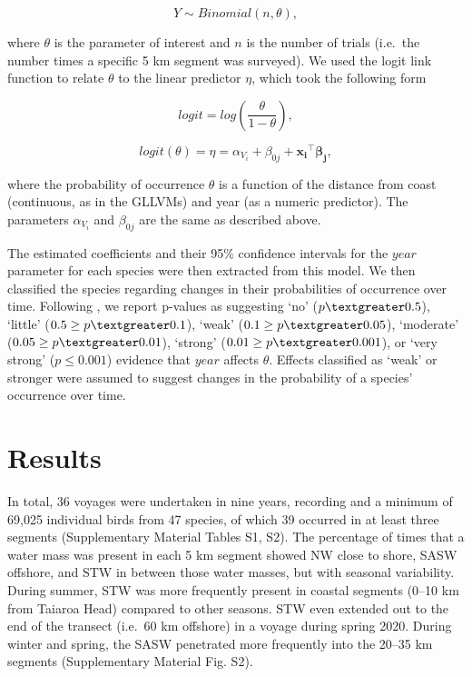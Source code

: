 \documentclass[preprint, 3p, authoryear]{elsarticle} %
\begin{document}
\[
Y \sim Binomial(n, \theta),
\]

\noindent
where \(\theta\) is the parameter of interest and \(n\) is the number of trials (i.e.~the number times a specific 5 km segment was surveyed). We used the logit link function to relate \(\theta\) to the linear predictor \(\eta\), which took the following form

\[
logit = log(\frac{\theta}{1-\theta}),
\]

\[
logit(\theta) = \eta = \alpha_{V_i} + \beta_{0j} + \mathbf{x_i}^\top \mathbf{\beta_j},
\]

\noindent
where the probability of occurrence \(\theta\) is a function of the distance from coast (continuous, as in the GLLVMs) and year (as a numeric predictor). The parameters \(\alpha_{V_i}\) and \(\beta_{0j}\) are the same as described above.

The estimated coefficients and their 95\% confidence intervals for the \(year\) parameter for each species were then extracted from this model. We then classified the species regarding changes in their probabilities of occurrence over time. Following \citet{muff2022}, we report p-values as suggesting `no' ($p \textgreater0.5$), `little' ($0.5\geq p \textgreater0.1$), `weak' ($0.1\geq p \textgreater0.05$), `moderate' ($0.05\geq p \textgreater0.01$), `strong' ($0.01\geq p \textgreater0.001$), or `very strong' ($p \leq0.001$) evidence that \(year\) affects \(\theta\). Effects classified as `weak' or stronger were assumed to suggest changes in the probability of a species' occurrence over time.

\hypertarget{results}{%
\section{Results}\label{results}}

In total, 36 voyages were undertaken in nine years, recording and a minimum of 69,025 individual birds from 47 species, of which 39 occurred in at least three segments (Supplementary Material Tables S1, S2). The percentage of times that a water mass was present in each 5 km segment showed NW close to shore, SASW offshore, and STW in between those water masses, but with seasonal variability. During summer, STW was more frequently present in coastal segments (0--10 km from Taiaroa Head) compared to other seasons. STW even extended out to the end of the transect (i.e.~60 km offshore) in a voyage during spring 2020. During winter and spring, the SASW penetrated more frequently into the 20--35 km segments (Supplementary Material Fig. S2).
\end{document}
